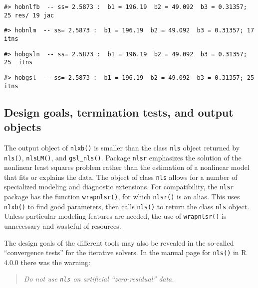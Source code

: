 \begin{verbatim}
#> hobnlfb  -- ss= 2.5873 :  b1 = 196.19  b2 = 49.092  b3 = 0.31357; 25 res/ 19 jac
\end{verbatim}

\begin{verbatim}
#> hobnlm  -- ss= 2.5873 :  b1 = 196.19  b2 = 49.092  b3 = 0.31357; 17  itns
\end{verbatim}

\begin{verbatim}
#> hobgsln  -- ss= 2.5873 :  b1 = 196.19  b2 = 49.092  b3 = 0.31357; 25  itns
\end{verbatim}

\begin{verbatim}
#> hobgsl  -- ss= 2.5873 :  b1 = 196.19  b2 = 49.092  b3 = 0.31357; 25  itns
\end{verbatim}

\hypertarget{design-goals-termination-tests-and-output-objects}{%
\subsection{Design goals, termination tests, and output objects}\label{design-goals-termination-tests-and-output-objects}}

The output object of \texttt{nlxb()} is smaller than the class \texttt{nls} object returned
by \texttt{nls()}, \texttt{nlsLM()}, and \texttt{gsl\_nls()}. Package \texttt{nlsr} emphasizes the solution
of the nonlinear least squares problem rather than the estimation of a nonlinear
model that fits or explains the data. The object of class \texttt{nls} allows for
a number of specialized modeling and diagnostic extensions. For compatibility,
the \texttt{nlsr} package has the function \texttt{wrapnlsr()}, for which \texttt{nlsr()} is an alias.
This uses \texttt{nlxb()} to find good parameters, then calls \texttt{nls()} to return the class
\texttt{nls} object. Unless particular modeling features are needed, the use of
\texttt{wrapnlsr()} is unnecessary and wasteful of resources.

The design goals of the different tools may also be revealed in the so-called
``convergence tests'' for the iterative solvers. In the manual page for \texttt{nls()}
in R 4.0.0 there was the warning:

\begin{quote}
\emph{Do not use \texttt{nls} on artificial ``zero-residual'' data.}
\end{quote}

